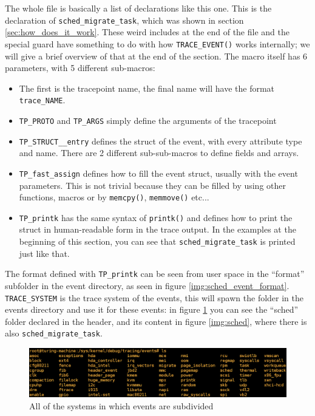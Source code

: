 The whole file is basically a list of declarations like this one. This is the declaration of \verb|sched_migrate_task|, which was shown in section \ref{sec:how_does_it_work}. These weird includes at the end of the file and the special guard have something to do with how \verb|TRACE_EVENT()| works internally; we will give a brief overview of that at the end of the section. The macro itself has 6 parameters, with 5 different sub-macros:
\begin{itemize}
    \item The first is the tracepoint name, the final name will have the format \verb|trace_NAME|.
    \item \verb|TP_PROTO| and \verb|TP_ARGS| simply define the arguments of the tracepoint
    \item \verb|TP_STRUCT__entry| defines the struct of the event, with every attribute type and name. There are 2 different sub-sub-macros to define fields and arrays.
    \item \verb|TP_fast_assign| defines how to fill the event struct, usually with the event parameters. This is not trivial because they can be filled by using other functions, macros or by \verb|memcpy()|, \verb|memmove()| etc...
    \item \verb|TP_printk| has the same syntax of \verb|printk()| and defines how to print the struct in human-readable form in the trace output. In the examples at the beginning of this section, you can see that \verb|sched_migrate_task| is printed just like that.
\end{itemize}

The format defined with \verb|TP_printk| can be seen from user space in the ``format'' subfolder in the event directory, as seen in figure \ref{img:sched_event_format}. \verb|TRACE_SYSTEM| is the trace system of the events, this will spawn the folder in the events directory and use it for these events: in figure \ref{img:systems} you can see the ``sched'' folder declared in the header, and its content in figure \ref{img:sched}, where there is also \verb|sched_migrate_task|. 
\begin{figure}[ht]
\includegraphics[width=\textwidth]{images/shell_trace_systems.png} 
\caption{All of the systems in which events are subdivided}
\label{img:systems}
\end{figure}

